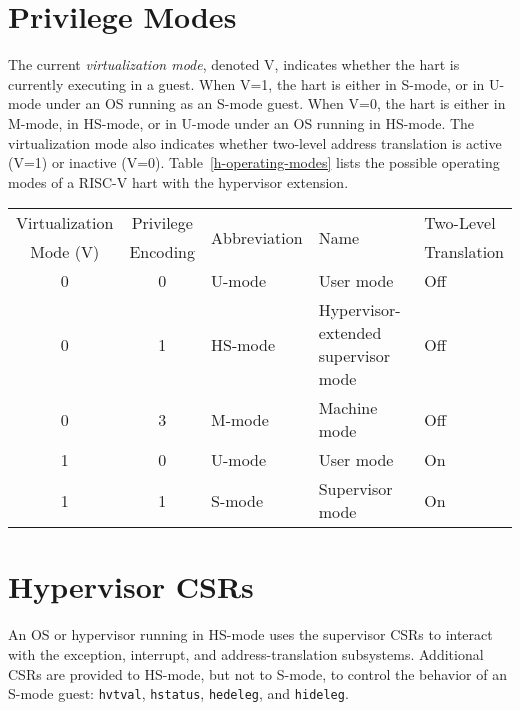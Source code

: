 \section{Privilege Modes}

The current {\em virtualization mode}, denoted V, indicates whether the hart
is currently executing in a guest.  When V=1, the hart is either in S-mode, or
in U-mode under an OS running as an S-mode guest.  When V=0, the hart is
either in M-mode, in HS-mode, or in U-mode under an OS running in HS-mode.
The virtualization mode also indicates whether two-level address translation
is active (V=1) or inactive (V=0).  Table~\ref{h-operating-modes} lists the
possible operating modes of a RISC-V hart with the hypervisor extension.

\begin{table*}[h!]
\begin{center}
\begin{tabular}{|c|c||l|l|l|}
  \hline
   Virtualization & Privilege & \multirow{2}{*}{Abbreviation} & \multirow{2}{*}{Name} & Two-Level \\
   Mode (V)       & Encoding  &                               &                       & Translation \\ \hline
   0              & 0         & U-mode  & User mode & Off \\
   0              & 1         & HS-mode & Hypervisor-extended supervisor mode & Off \\
   0              & 3         & M-mode  & Machine mode & Off \\
  \hline
   1              & 0         & U-mode  & User mode & On \\
   1              & 1         & S-mode  & Supervisor mode & On \\
  \hline
 \end{tabular}
\end{center}
\caption{Operating modes with the hypervisor extension.}
\label{h-operating-modes}
\end{table*}

\section{Hypervisor CSRs}

An OS or hypervisor running in HS-mode uses the supervisor CSRs to interact with the exception,
interrupt, and address-translation subsystems.
Additional CSRs are provided to HS-mode, but not to S-mode, to control
the behavior of an S-mode guest:
{\tt hvtval}, {\tt hstatus}, {\tt hedeleg}, and
{\tt hideleg}.

